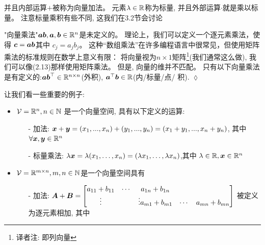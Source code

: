 并且内部运算$+$被称为向量加法。
元素$\lambda \in \mathbb{R}$称为标量,
并且外部运算$\cdot$就是乘以标量。
注意标量乘积有些不同,  这我们在3.2节会讨论
\begin{remark}
    "向量乘法"$\boldsymbol{ab}, \boldsymbol{a}, \boldsymbol{b} \in \mathbb{R}^n$是未定义的。
    理论上，我们可以定义一个逐元素乘法，使得
    $\boldsymbol{c} = \boldsymbol{ab}$其中
    $c_j = a_j b_j$。
    这种“数组乘法”在许多编程语言中很常见，但使用矩阵乘法的标准规则在数学上意义有限：
    将向量视为$n \times 1$矩阵\footnote{译者注: 即列向量}(我们通常这么做), 我们可以像(2.13)那样使用矩阵乘法。
    但是, 向量的维并不匹配。
    只有以下向量乘法是有定义的:$\boldsymbol{ab}^\top \in \mathbb{R}^{n \times n}$(外积),
    $\boldsymbol{a}^\top\boldsymbol{b} \in \mathbb{R}$(内/标量/点/ 积). \hfill $\lozenge$
\end{remark}

\begin{example}[向量空间]
    让我们看一些重要的例子:
    \begin{itemize}
        \item $\mathcal{V} = \mathbb{R}^n, n \in \mathbb{N}$
              是一个向量空间, 具有以下定义的运算:
              \begin{itemize}
                  \item[-] 加法:
                           $\boldsymbol{x} + \boldsymbol{y} = (x_1,...,x_n) + (y_1,...,y_n)=
                           (x_1 + y_1, ..., x_n+y_n)$, 其中
                           $\forall \boldsymbol{x}, \boldsymbol{y} \in \mathbb{R}^n$
                  \item[-] 标量乘法:
                           $\lambda\boldsymbol{x} = \lambda(x_1,\dots, x_n) =
                           (\lambda x_1, \dots, \lambda x_n)$,其中
                           $\lambda \in \mathbb{R}, \boldsymbol{x} \in \mathbb{R}^n$
              \end{itemize}
        \item $\mathcal{V} = \mathbb{R}^{m \times n}, m,n \in \mathbb{N}$是一个向量空间具有
              \begin{itemize}
                  \item[-] 加法:
                           $
                           \boldsymbol{A} + \boldsymbol{B} =
                           \begin{bmatrix}
                               a_{11} + b_{11} & \cdots & a_{1n} + b_{1n} \\
                               \vdots & & \vdots
                               a_{m1} + b_{m1} & \cdots & a_{mn} + b_{mn} \\
                           \end{bmatrix}
                           $
                           被定义为逐元素相加, 其中

\end{itemize}
\end{itemize}
\end{example}
